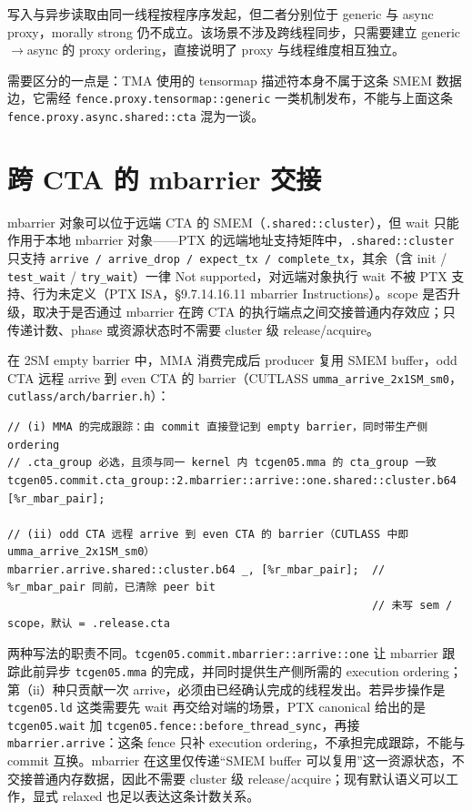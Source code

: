 写入与异步读取由同一线程按程序序发起，但二者分别位于 generic 与 async proxy，morally strong 仍不成立。该场景不涉及跨线程同步，只需要建立 generic$\rightarrow$async 的 proxy ordering，直接说明了 proxy 与线程维度相互独立。

需要区分的一点是：TMA 使用的 tensormap 描述符本身不属于这条 SMEM 数据边，它需经 \lstinline|fence.proxy.tensormap::generic| 一类机制发布，不能与上面这条 \lstinline|fence.proxy.async.shared::cta| 混为一谈。

\section{跨 CTA 的 mbarrier 交接}

mbarrier 对象可以位于远端 CTA 的 SMEM（\lstinline|.shared::cluster|），但 wait 只能作用于本地 mbarrier 对象——PTX 的远端地址支持矩阵中，\lstinline|.shared::cluster| 只支持 \lstinline|arrive / arrive_drop / expect_tx / complete_tx|，其余（含 init / \lstinline|test_wait| / \lstinline|try_wait|）一律 Not supported，对远端对象执行 wait 不被 PTX 支持、行为未定义（PTX ISA，§9.7.14.16.11 mbarrier Instructions）。scope 是否升级，取决于是否通过 mbarrier 在跨 CTA 的执行端点之间交接普通内存效应；只传递计数、phase 或资源状态时不需要 cluster 级 release/acquire。

在 2SM empty barrier 中，MMA 消费完成后 producer 复用 SMEM buffer，odd CTA 远程 arrive 到 even CTA 的 barrier（CUTLASS \lstinline|umma_arrive_2x1SM_sm0|，\lstinline|cutlass/arch/barrier.h|）：

\begin{lstlisting}
// (i) MMA 的完成跟踪：由 commit 直接登记到 empty barrier，同时带生产侧 ordering
// .cta_group 必选，且须与同一 kernel 内 tcgen05.mma 的 cta_group 一致
tcgen05.commit.cta_group::2.mbarrier::arrive::one.shared::cluster.b64 [%r_mbar_pair];

// (ii) odd CTA 远程 arrive 到 even CTA 的 barrier（CUTLASS 中即 umma_arrive_2x1SM_sm0）
mbarrier.arrive.shared::cluster.b64 _, [%r_mbar_pair];  // %r_mbar_pair 同前，已清除 peer bit
                                                        // 未写 sem / scope，默认 = .release.cta
\end{lstlisting}

两种写法的职责不同。\lstinline|tcgen05.commit.mbarrier::arrive::one| 让 mbarrier 跟踪此前异步 \lstinline|tcgen05.mma| 的完成，并同时提供生产侧所需的 execution ordering；第（ii）种只贡献一次 arrive，必须由已经确认完成的线程发出。若异步操作是 \lstinline|tcgen05.ld| 这类需要先 wait 再交给对端的场景，PTX canonical 给出的是 \lstinline|tcgen05.wait| 加 \lstinline|tcgen05.fence::before_thread_sync|，再接 \lstinline|mbarrier.arrive|：这条 fence 只补 execution ordering，不承担完成跟踪，不能与 commit 互换。mbarrier 在这里仅传递“SMEM buffer 可以复用”这一资源状态，不交接普通内存数据，因此不需要 cluster 级 release/acquire；现有默认语义可以工作，显式 relaxed 也足以表达这条计数关系。

